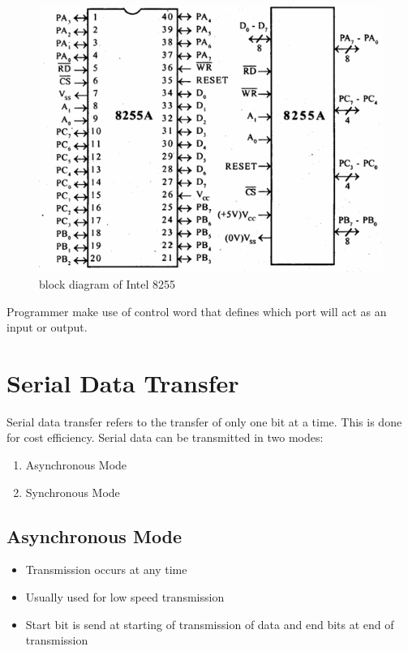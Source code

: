 \documentclass[12pt]{report}
\begin{document}
\begin{figure}[!h]
	\centering
	\includegraphics[scale=0.5]{0.png}
	  \caption{block diagram of Intel 8255}
\end{figure}

Programmer make use of control word that defines which 
port will act as an input or output.


\section{Serial Data Transfer}

Serial data transfer refers to the transfer of only one bit at a time. This is done for cost efficiency. Serial data can be transmitted in two modes:
\begin{enumerate}
\item {Asynchronous Mode}
\item  {Synchronous Mode}
\end{enumerate}

\subsection{Asynchronous Mode}

\begin{itemize}
\item{Transmission occurs at any time }
\item{Usually used for low speed transmission}
\item{Start bit is send at starting of transmission of data and end bits at end of transmission}
\end{itemize}
\end{document}
